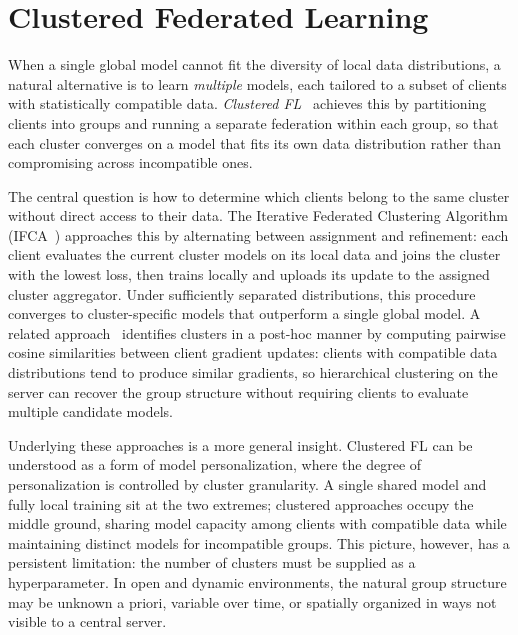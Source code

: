 \section{Clustered Federated Learning}
\label{sec:fl-clustered}

When a single global model cannot fit the diversity of local data distributions,
 a natural alternative is to learn \emph{multiple} models,
 each tailored to a subset of clients with statistically compatible data.
%
\emph{Clustered \gls{FL}}~\cite{DBLP:journals/tit/GhoshCYR22,DBLP:journals/tnn/SattlerMS21}
 achieves this by partitioning clients into groups
 and running a separate federation within each group,
 so that each cluster converges on a model that fits its own data distribution
 rather than compromising across incompatible ones.

The central question is how to determine which clients belong to the same cluster
 without direct access to their data.
%
The Iterative Federated Clustering Algorithm
 (IFCA~\cite{DBLP:journals/tit/GhoshCYR22}) approaches this
 by alternating between assignment and refinement:
 each client evaluates the current cluster models on its local data
 and joins the cluster with the lowest loss,
 then trains locally and uploads its update to the assigned cluster aggregator.
%
Under sufficiently separated distributions,
 this procedure converges to cluster-specific models
 that outperform a single global model.
%
A related approach~\cite{DBLP:journals/tnn/SattlerMS21}
 identifies clusters in a post-hoc manner
 by computing pairwise cosine similarities between client gradient updates:
 clients with compatible data distributions tend to produce similar gradients,
 so hierarchical clustering on the server can recover the group structure
 without requiring clients to evaluate multiple candidate models.

Underlying these approaches is a more general insight.
%
Clustered \gls{FL} can be understood as a form of model personalization,
 where the degree of personalization is controlled by cluster granularity.
%
A single shared model and fully local training sit at the two extremes;
 clustered approaches occupy the middle ground,
 sharing model capacity among clients with compatible data
 while maintaining distinct models for incompatible groups.
%
This picture, however, has a persistent limitation:
 the number of clusters must be supplied as a hyperparameter.
%
In open and dynamic environments, the natural group structure may be unknown a priori,
 variable over time, or spatially organized in ways not visible to a central server.
